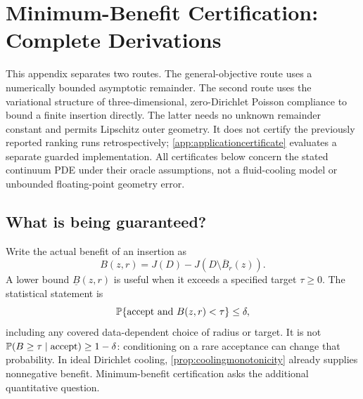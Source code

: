 \section{Minimum-Benefit Certification: Complete Derivations}
\label{app:minbenefit}

This appendix separates two routes. The general-objective route uses a
numerically bounded asymptotic remainder. The second route uses the
variational structure of three-dimensional, zero-Dirichlet Poisson compliance
to bound a finite insertion directly. The latter needs no unknown remainder
constant and permits Lipschitz outer geometry. It does not certify the
previously reported ranking runs retrospectively; \cref{app:applicationcertificate} evaluates a separate guarded implementation. All certificates below
concern the stated continuum PDE under their oracle assumptions, not a
fluid-cooling model or unbounded floating-point geometry error.

\subsection{What is being guaranteed?}

Write the actual benefit of an insertion as
\[
 B(z,r)=J(D)-J(D\setminus\overline B_r(z)).
\]
A lower bound $\underline B(z,r)$ is useful when it exceeds a specified
target $\tau\ge0$. The statistical statement is
\begin{equation}
 \mathbb{P}\{\text{accept and }B(z,r)<\tau\}\le\delta,
 \label{eq:benefitfailure}
\end{equation}
including any covered data-dependent choice of radius or target. It is not
$\mathbb{P}(B\ge\tau\mid\text{accept})\ge1-\delta$: conditioning on a rare
acceptance can change that probability. In ideal Dirichlet cooling,
\cref{prop:coolingmonotonicity} already supplies nonnegative benefit.
Minimum-benefit certification asks the additional quantitative question.

